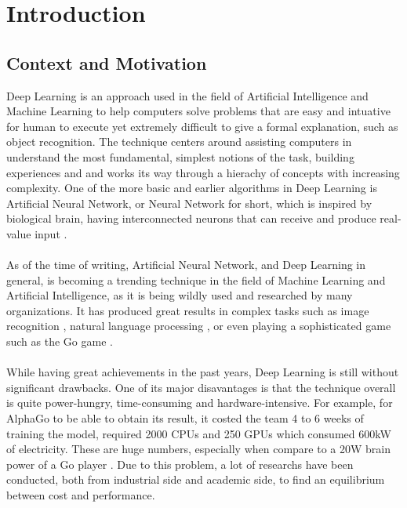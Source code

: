 \chapter{Introduction}

\section{Context and Motivation}

Deep Learning is an approach used in the field of Artificial Intelligence and Machine Learning to help computers solve problems that are easy and intuative for human to execute yet extremely difficult to give a formal explanation, such as object recognition. The technique centers around assisting computers in understand the most fundamental, simplest notions of the task, building experiences and and works its way through a hierachy of concepts with increasing complexity. One of the more basic and earlier algorithms in Deep Learning is Artificial Neural Network, or Neural Network for short, which is inspired by biological brain, having interconnected neurons that can receive and produce real-value input \cite{Goodfellow-et-al-2016}. \\
~\\
As of the time of writing, Artificial Neural Network, and Deep Learning in general, is becoming a trending technique in the field of Machine Learning and Artificial Intelligence, as it is being wildly used and researched by many organizations. It has produced great results in complex tasks such as image recognition \cite{Krizhevsky:2012:ICD:2999134.2999257}, natural language processing \cite{recent-advances-in-deep-learning-for-speech-research-at-microsoft}, or even playing a sophisticated game such as the Go game \cite{GoGame}. \\ 
~\\
While having great achievements in the past years, Deep Learning is still without significant drawbacks. One of its major disavantages is that the technique overall is quite power-hungry, time-consuming and hardware-intensive. For example, for AlphaGo to be able to obtain its result, it costed the team 4 to 6 weeks of training the model, required 2000 CPUs and 250 GPUs which consumed 600kW of electricity. These are huge numbers, especially when compare to a 20W brain power of a Go player \cite{GoGame}. Due to this problem, a lot of researchs have been conducted, both from industrial side and academic side, to find an equilibrium between cost and performance. \\

